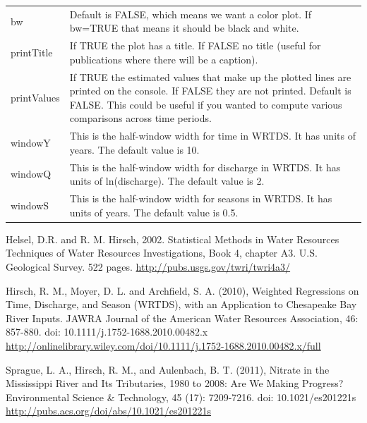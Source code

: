 \documentclass[a4paper,11pt]{article}
\begin{document}
\begin{table}[ht]
\begin{tabularx}{\textwidth}{lX}
bw & Default is FALSE, which means we want a color plot.  If bw=TRUE that means it should be black and white.\\
printTitle & If TRUE the plot has a title.  If FALSE no title (useful for publications where there will be a caption).\\
printValues & If TRUE the estimated values that make up the plotted lines are printed on the console.  If FALSE they are not printed.  Default is FALSE.  This could be useful if you wanted to compute various comparisons across time periods.\\
windowY & This is the half-window width for time in WRTDS.  It has units of years.  The default value is 10. \\
windowQ & This is the half-window width for discharge in WRTDS.  It has units of ln(discharge).  The default value is 2. \\
windowS & This is the half-window width for seasons in WRTDS.  It has units of years.  The default value is 0.5. \\
\hline
\end{tabularx}

\end{table}

\FloatBarrier

\clearpage
\begin{thebibliography}{10}

Helsel, D.R. and R. M. Hirsch, 2002. Statistical Methods in Water Resources Techniques of Water Resources Investigations, Book 4, chapter A3. U.S. Geological Survey. 522 pages. \url{http://pubs.usgs.gov/twri/twri4a3/}

Hirsch, R. M., Moyer, D. L. and Archfield, S. A. (2010), Weighted Regressions on Time, Discharge, and Season (WRTDS), with an Application to Chesapeake Bay River Inputs. JAWRA Journal of the American Water Resources Association, 46: 857-880. doi: 10.1111/j.1752-1688.2010.00482.x \url{http://onlinelibrary.wiley.com/doi/10.1111/j.1752-1688.2010.00482.x/full}

Sprague, L. A., Hirsch, R. M., and Aulenbach, B. T. (2011), Nitrate in the Mississippi River and Its Tributaries, 1980 to 2008: Are We Making Progress? Environmental Science \& Technology, 45 (17): 7209-7216. doi: 10.1021/es201221s \url{http://pubs.acs.org/doi/abs/10.1021/es201221s}

\end{thebibliography}
\end{document}
